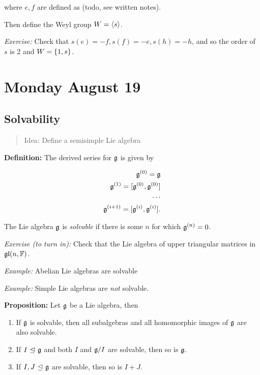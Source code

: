where \(e,f\) are defined as (todo, see written notes).

Then define the Weyl group \(W = \left\langle{s}\right\rangle\).

\emph{Exercise:} Check that \(s(e) = -f, s(f) = -e, s(h) = -h\), and so
the order of \(s\) is 2 and \(W = \left\{{1, s}\right\}\).

\hypertarget{monday-august-19}{%
\section{Monday August 19}\label{monday-august-19}}

\hypertarget{solvability}{%
\subsection{Solvability}\label{solvability}}

\begin{quote}
Idea: Define a semisimple Lie algebra
\end{quote}

\textbf{Definition:} The derived series for \({\mathfrak{g}}\) is given by

\begin{align*}
{\mathfrak{g}}^{(0)} = {\mathfrak{g}} \\
{\mathfrak{g}}^{(1)} = [{\mathfrak{g}}^{(0)}, {\mathfrak{g}}^{(0)}] \\
\cdots \\
{\mathfrak{g}}^{(i+1)} = [{\mathfrak{g}}^{(i)}, {\mathfrak{g}}^{(i)}]
.\end{align*}

The Lie algebra \({\mathfrak{g}}\) is \emph{solvable} if there is some \(n\) for
which \({\mathfrak{g}}^{(n)} = 0\).

\emph{Exercise (to turn in):} Check that the Lie algebra of upper
triangular matrices in \({\mathfrak{gl}}(n, {\mathbb{F}})\).

\emph{Example:} Abelian Lie algebras are solvable

\emph{Example:} Simple Lie algebras are \emph{not} solvable.

\textbf{Proposition:} Let \({\mathfrak{g}}\) be a Lie algebra, then

\begin{enumerate}
\def\labelenumi{\arabic{enumi}.}
\tightlist
\item
  If \({\mathfrak{g}}\) is solvable, then all subalgebras and all homomorphic
  images of \({\mathfrak{g}}\) are also solvable.
\item
  If \(I {~\trianglelefteq~} {\mathfrak{g}}\) and both \(I\) and \({\mathfrak{g}}/I\) are solvable,
  then so is \({\mathfrak{g}}\).
\item
  If \(I, J {~\trianglelefteq~} {\mathfrak{g}}\) are solvable, then so is \(I+J\).
\end{enumerate}

